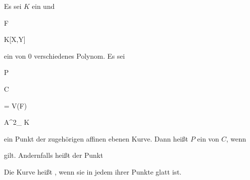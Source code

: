 
{}

{


Es sei $K$ ein
und


\mavergleichskette

{\vergleichskette

{F
}

{ \in }{ K[X,Y]
}

{  }{
}

{    }{
}

{   }{
}

}
{}{}{}
ein von $0$ verschiedenes Polynom. Es sei


\mavergleichskette

{\vergleichskette

{P
}

{ \in }{ C
}

{ = }{ V(F)
}

{ \subset   }{ {\mathbb A}^{2}_{ K }
}

{   }{
}

}
{}{}{}
ein Punkt der zugehörigen affinen ebenen Kurve. Dann heißt $P$ ein  von $C$, wenn


 {  }


gilt. Andernfalls heißt der Punkt 


}


Die Kurve heißt  {,} wenn sie in jedem ihrer Punkte glatt ist.



{}

